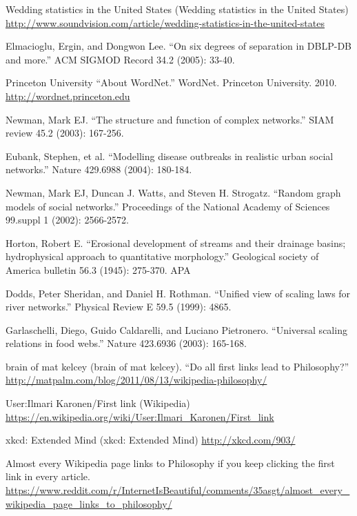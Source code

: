 \documentclass[pre,twocolumn,twoside,superscriptaddress,floatfix, aps, 10pt]{revtex4-1}
\begin{document}
\begin{thebibliography}{1}
     Wedding statistics in the United States (Wedding statistics in the United States)
    \url{http://www.soundvision.com/article/wedding-statistics-in-the-united-states}

     Elmacioglu, Ergin, and Dongwon Lee. ``On six degrees of separation in DBLP-DB and more.'' ACM SIGMOD Record 34.2 (2005): 33-40.

     Princeton University ``About WordNet.'' WordNet. Princeton University. 2010. 
    \url{http://wordnet.princeton.edu}

     Newman, Mark EJ. ``The structure and function of complex networks.'' SIAM review 45.2 (2003): 167-256.

     Eubank, Stephen, et al. ``Modelling disease outbreaks in realistic urban social networks.'' Nature 429.6988 (2004): 180-184.

     Newman, Mark EJ, Duncan J. Watts, and Steven H. Strogatz. ``Random graph models of social networks.'' Proceedings of the National Academy of Sciences 99.suppl 1 (2002): 2566-2572.

     Horton, Robert E. ``Erosional development of streams and their drainage basins; hydrophysical approach to quantitative morphology.'' Geological society of America bulletin 56.3 (1945): 275-370.
    APA

     Dodds, Peter Sheridan, and Daniel H. Rothman. ``Unified view of scaling laws for river networks.'' Physical Review E 59.5 (1999): 4865.

     Garlaschelli, Diego, Guido Caldarelli, and Luciano Pietronero. ``Universal scaling relations in food webs.'' Nature 423.6936 (2003): 165-168.
    
     brain of mat kelcey (brain of mat kelcey). 
    ``Do all first links lead to Philosophy?''
    \url{http://matpalm.com/blog/2011/08/13/wikipedia-philosophy/}

     User:Ilmari Karonen/First link (Wikipedia)
    \url{https://en.wikipedia.org/wiki/User:Ilmari_Karonen/First_link}

     xkcd: Extended Mind (xkcd: Extended Mind)
    \url{http://xkcd.com/903/}

     Almost every Wikipedia page links to Philosophy if you keep clicking the first link in every article. 
    \url{https://www.reddit.com/r/InternetIsBeautiful/comments/35asgt/almost_every_wikipedia_page_links_to_philosophy/}


\end{thebibliography}
\end{document}
